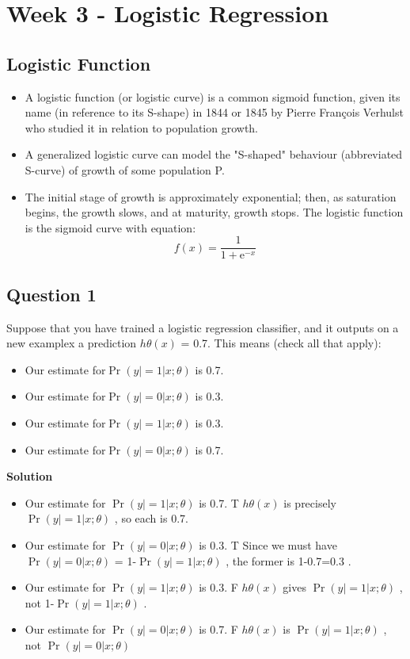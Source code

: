 \documentclass[11pt]{article} %
\begin{document}
	\section{Week 3 - Logistic Regression}
	
	\subsection{Logistic Function}
	\begin{itemize}
		\item A logistic function (or logistic curve) is a common sigmoid function, given its name (in reference to its S-shape) in 1844 or 1845 by Pierre François Verhulst who studied it in relation to population growth. 
		
		\item A generalized logistic curve can model the "S-shaped" behaviour (abbreviated S-curve) of growth of some population P. 
		
		\item The initial stage of growth is approximately exponential; then, as saturation begins, the growth slows, and at maturity, growth stops.
		The logistic function is the sigmoid curve with equation:
		\[ f(x) = \frac{1}{1 + \mathrm e^{-x}} \]
		
	\end{itemize}
	
	
\subsection{Question 1}

Suppose that you have trained a logistic regression classifier, and it outputs on a new examplex a prediction $h\theta(x)$ = 0.7.
This means (check all that apply): 
\begin{itemize}
	\item Our estimate for$ \Pr(y|=1|x;\theta)$ is 0.7.
	\item Our estimate for$ \Pr(y|=0|x;\theta)$ is 0.3.
	\item Our estimate for$ \Pr(y|=1|x;\theta)$ is 0.3.
	\item Our estimate for$ \Pr(y|=0|x;\theta)$ is 0.7.
\end{itemize}


\textbf{Solution} 
\begin{itemize}
\item Our estimate for $ \Pr(y|=1|x;\theta)$ is 0.7.  T
$h\theta(x)$ is precisely$ \Pr(y|=1|x;\theta)$ , so each is 0.7.
\item Our estimate for $ \Pr(y|=0|x;\theta)$ is 0.3.  
T Since we must have $ \Pr(y|=0|x;\theta)$ = 1-$ \Pr(y|=1|x;\theta)$ , the former is 1-0.7=0.3 .
\item Our estimate for $ \Pr(y|=1|x;\theta)$ is 0.3.  
F $h\theta(x)$ gives $ \Pr(y|=1|x;\theta)$ , not 1-$ \Pr(y|=1|x;\theta)$ . 
\item Our estimate for $ \Pr(y|=0|x;\theta)$ is 0.7.  
F $h\theta(x)$ is $ \Pr(y|=1|x;\theta)$ , not $ \Pr(y|=0|x;\theta)$
\end{itemize}
 
\end{document}
